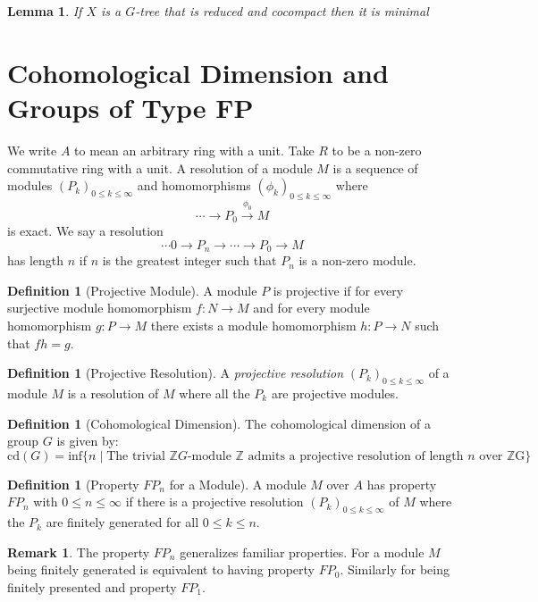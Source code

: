 \documentclass[12pt,parskip=full]{report}
\theoremstyle{plain}
\newtheorem{lem}[thm]{Lemma}
\theoremstyle{definition}
\newtheorem{rmk}[thm]{Remark}
\newtheorem{dfn}[thm]{Definition}
\begin{document}
\begin{lem}
    \label{reducedcocompact}
    If \(X\) is a \(G\)-tree that is reduced and cocompact then it is minimal
\end{lem}


\section{Cohomological Dimension and Groups of Type FP}


We write \(A\) to mean an arbitrary ring with a unit. Take \(R\) to be a non-zero commutative ring with a unit. A resolution of a module \(M\) is a sequence of modules \((P_k)_{0\leq k\leq \infty}\) and homomorphisms \((\phi_k)_{0\leq k\leq \infty}\) where \[\cdots \to P_0 \overset{\phi_0}{\to} M\] is exact. We say a resolution \[\cdots 0\to P_n\to \cdots\to P_0 \to M\] has length \(n\) if \(n\) is the greatest integer such that \(P_n\) is a non-zero module.

\begin{dfn}
    [Projective Module]
    A module \(P\) is projective if for every surjective module homomorphism \(f: N\to M\) and for every module homomorphism \(g: P\to M\) there exists a module homomorphism \(h: P\to N\) such that \(fh = g\).
\end{dfn}

\begin{dfn}
    [Projective Resolution]
    A \emph{projective resolution} \((P_k)_{0\leq k\leq \infty}\) of a module \(M\) is a resolution of \(M\) where all the \(P_k\) are projective modules.
\end{dfn}

\begin{dfn}
[Cohomological Dimension]
The cohomological dimension of a group \(G\) is given by:
\[
    \text{cd}(G) = \text{inf}\{n\mid\text{The trivial }\mathbb{Z}G\text{-module }\mathbb{Z}\text{ admits a projective resolution of length \(n\) over \(\mathbb{Z}\)G}\}
\]
\end{dfn}

\begin{dfn}
[Property \(FP_n\) for a Module]

A module \(M\) over \(A\) has property \(FP_n\) with \(0\leq n\leq \infty\) if there is a projective resolution \((P_k)_{0\leq k\leq \infty}\) of \(M\) where the \(P_k\) are finitely generated for all \(0\leq k\leq n\).
\end{dfn}

\begin{rmk}
The property \(FP_n\) generalizes familiar properties. For a module \(M\) being finitely generated is equivalent to having property \(FP_0\). Similarly for being finitely presented and property \(FP_1\).
\end{rmk}
\end{document}
